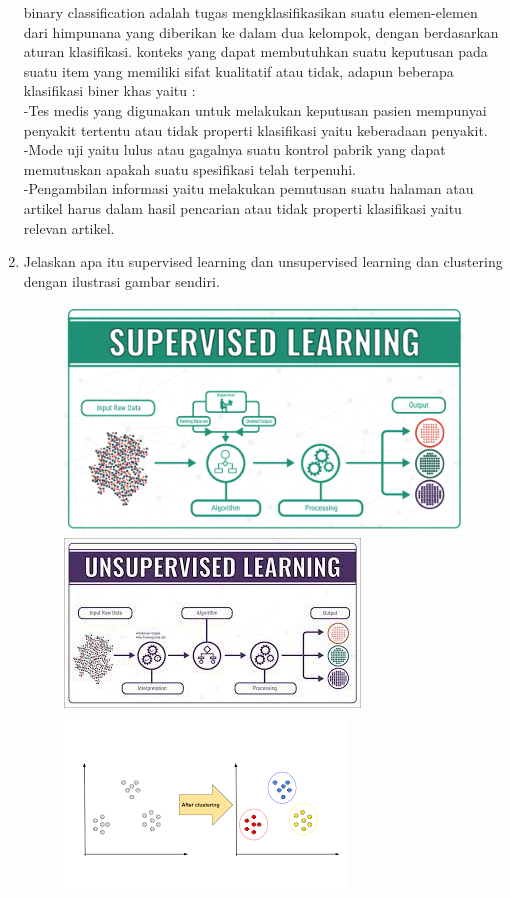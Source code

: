 \begin{enumerate}
binary classification adalah tugas mengklasifikasikan suatu elemen-elemen dari himpunana yang diberikan ke dalam dua kelompok, dengan berdasarkan aturan klasifikasi. konteks yang dapat membutuhkan suatu keputusan pada suatu item yang memiliki sifat kualitatif atau tidak, adapun beberapa klasifikasi biner khas yaitu :\\
-Tes medis yang digunakan untuk melakukan keputusan pasien mempunyai penyakit tertentu atau tidak properti klasifikasi yaitu keberadaan penyakit.\\
-Mode uji yaitu lulus atau gagalnya suatu kontrol pabrik yang dapat memutuskan apakah suatu spesifikasi telah terpenuhi.\\
-Pengambilan informasi yaitu melakukan pemutusan suatu halaman atau artikel harus dalam hasil pencarian atau tidak properti klasifikasi yaitu relevan artikel.
\item
Jelaskan apa itu supervised learning dan unsupervised learning dan clustering dengan ilustrasi gambar sendiri.
\begin{figure}[!htbp]
		\centering
		\includegraphics[scale=0.4]{figures/chapter2/supervised.png}
		\includegraphics[scale=0.4]{figures/chapter2/unsupervised.jpeg}
		\includegraphics[scale=0.4]{figures/chapter2/clustering.png}

\end{figure}
\end{enumerate}
